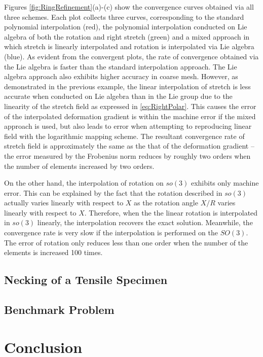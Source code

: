 \documentclass[12pt]{article}
\begin{document}
Figures \ref{fig:RingRefinement}(a)-(c) show the convergence curves obtained via all three schemes.  Each plot collects three curves, corresponding to the standard polynomial interpolation (red), the polynomial interpolation conducted on Lie algebra of both the rotation and right stretch (green) and a mixed approach in which stretch is linearly interpolated and rotation is interpolated via Lie algebra (blue).  As evident from the convergent plots, the rate of convergence obtained via the Lie algebra is faster than the standard interpolation approach. The Lie algebra approach also exhibits higher accuracy in coarse mesh. However, as demonstrated in the previous example, the linear interpolation of stretch is less accurate when conducted on Lie algebra than in the Lie group due to the linearity of the stretch field as expressed in \eqref{eq:RightPolar}. This causes the error of the interpolated deformation gradient is within the machine error if the mixed approach is used, but also  leads to error when attempting to reproducing linear field with the logarithmic mapping scheme. The resultant convergence rate of stretch field is approximately the same as the that of the deformation gradient --the error measured by the Frobenius norm reduces by roughly two orders when the number of elements increased by two orders.

On the other hand, the interpolation of rotation on $so(3)$ exhibits only machine error. This can be explained by the fact that the rotation described in $so(3)$ actually varies linearly with respect to $X$ as the rotation angle $X/R$ varies linearly with respect to $X$. Therefore, when the the linear rotation is interpolated in $so(3)$ linearly, the interpolation recovers the exact solution. Meanwhile, the convergence rate is very slow if the interpolation is performed on the $SO(3)$. The error of rotation only reduces less than one order when the number of the elements is increased 100 times. 

\subsection{Necking of a Tensile Specimen}

\subsection{Benchmark Problem}

\section{Conclusion}



\end{document}

